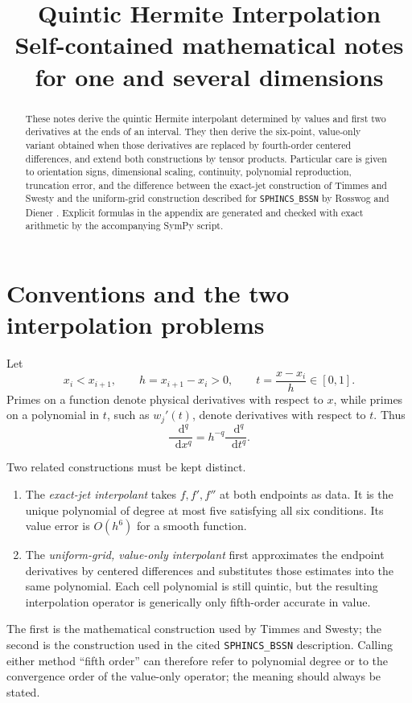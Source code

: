 \documentclass[11pt]{article}
\title{Quintic Hermite Interpolation\\
  \large Self-contained mathematical notes for one and several dimensions}
\author{}
\date{}
\newcommand{\dd}{\mathop{}\!\mathrm{d}}
\begin{document}
\maketitle

\begin{abstract}
These notes derive the quintic Hermite interpolant determined by values and
first two derivatives at the ends of an interval.  They then derive the
six-point, value-only variant obtained when those derivatives are replaced by
fourth-order centered differences, and extend both constructions by tensor
products.  Particular care is given to orientation signs, dimensional
scaling, continuity, polynomial reproduction, truncation error, and the
difference between the exact-jet construction of Timmes and Swesty
\cite{timmes-swesty} and the uniform-grid construction described for
\texttt{SPHINCS\_BSSN} by Rosswog and Diener \cite{rosswog-diener}.  Explicit
formulas in the appendix are generated and checked with exact arithmetic by
the accompanying SymPy script.
\end{abstract}

\tableofcontents

\section{Conventions and the two interpolation problems}
\label{sec:conventions}

Let
\[
  x_i<x_{i+1},\qquad h=x_{i+1}-x_i>0,
  \qquad t=\frac{x-x_i}{h}\in[0,1].
\]
Primes on a function denote physical derivatives with respect to $x$, while
primes on a polynomial in $t$, such as $w_j'(t)$, denote derivatives with
respect to $t$.  Thus
\begin{equation}
  \frac{\dd^q}{\dd x^q}=h^{-q}\frac{\dd^q}{\dd t^q}.
  \label{eq:physical-scaling}
\end{equation}

Two related constructions must be kept distinct.
\begin{enumerate}
  \item The \emph{exact-jet interpolant} takes
  $f,f',f''$ at both endpoints as data.  It is the unique polynomial of
  degree at most five satisfying all six conditions.  Its value error is
  $O(h^6)$ for a smooth function.
  \item The \emph{uniform-grid, value-only interpolant} first approximates
  the endpoint derivatives by centered differences and substitutes those
  estimates into the same polynomial.  Each cell polynomial is still
  quintic, but the resulting interpolation operator is generically only
  fifth-order accurate in value.
\end{enumerate}
The first is the mathematical construction used by Timmes and Swesty; the
second is the construction used in the cited \texttt{SPHINCS\_BSSN}
description.  Calling either method ``fifth order'' can therefore refer to
polynomial degree or to the convergence order of the value-only operator; the
meaning should always be stated.
\end{document}
